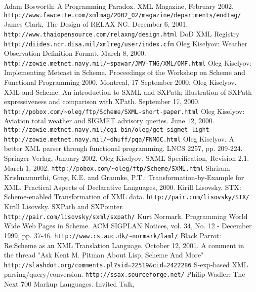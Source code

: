 \documentclass[10pt]{llncs}
\begin{document}
\begin{thebibliography}{10}
 Adam Bosworth: A Programming Paradox. XML Magazine, February 2002. \texttt{http://www.fawcette.com/xmlmag/2002\_02/magazine/departments/endtag/} 
 James Clark, The Design of RELAX NG. December 6, 2001. \texttt{http://www.thaiopensource.com/relaxng/design.html} 
 DoD XML Registry \texttt{http://diides.ncr.disa.mil/xmlreg/user/index.cfm} 
 Oleg Kiselyov: Weather Observation Definition Format. March 8, 2000. \texttt{http://zowie.metnet.navy.mil/\textasciitilde{}spawar/JMV-TNG/XML/OMF.html} 
 Oleg Kiselyov: Implementing Metcast in Scheme. Proceedings of the Workshop on Scheme and Functional Programming 2000. Montreal, 17 September 2000.
 Oleg Kiselyov. XML and Scheme. An introduction to
SXML and SXPath;  illustration of SXPath expressiveness and comparison with
XPath. September 17, 2000. \texttt{http://pobox.com/\textasciitilde{}oleg/ftp/Scheme/SXML-short-paper.html} 
 Oleg Kiselyov: Aviation total weather and SIGMET advisory queries. June 12, 2000.\\  \texttt{http://zowie.metnet.navy.mil/cgi-bin/oleg/get-sigmet-light}  \texttt{http://zowie.metnet.navy.mil/\textasciitilde{}dhuff/pqa/FNMOC.html} 
 Oleg Kiselyov. A better XML parser through functional programming. LNCS 2257, pp. 209-224. Springer-Verlag, January 2002.
 Oleg Kiselyov. SXML Specification. Revision 2.1. March 1, 2002. \texttt{http://pobox.com/\textasciitilde{}oleg/ftp/Scheme/SXML.html} 
 Shriram Krishnamurthi, Gray, K.E. and Graunke, P.T.: Transformation-by-Example for XML. Practical Aspects of Declarative Languages, 2000.
 Kirill Lisovsky. STX: Scheme-enabled Transformation of XML data.  \texttt{http://pair.com/lisovsky/STX/} 
 Kirill Lisovsky. SXPath and SXPointer.  \texttt{http://pair.com/lisovsky/sxml/sxpath/} 
 Kurt Normark. Programming World Wide Web Pages in Scheme. ACM SIGPLAN Notices, vol. 34, No. 12 - December 1999, pp. 37-46. \texttt{http://www.cs.auc.dk/\textasciitilde{}normark/laml/} 
 Black Parrot: Re:Scheme as an XML Translation Language. 
October 12, 2001. A comment in the thread "Ask Kent M. Pitman About Lisp, Scheme And More" \texttt{http://slashdot.org/comments.pl?sid=22519\&cid=2422286} 
 S-exp-based XML parsing/query/conversion.  \texttt{http://ssax.sourceforge.net/} 
 Philip Wadler: The Next 700 Markup Languages. Invited Talk,

\end{thebibliography}
\end{document}
